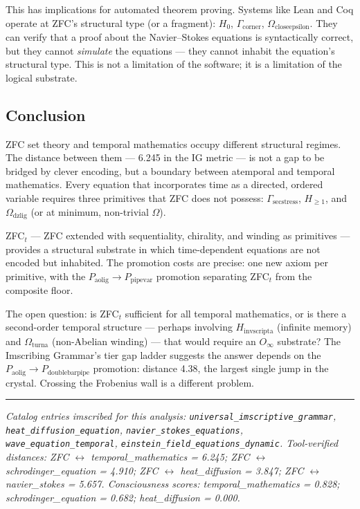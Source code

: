 \documentclass[12pt,a4paper]{article}
\begin{document}
This has implications for automated theorem proving. Systems like Lean and Coq operate at ZFC's structural type (or a fragment): $H_0$, $\Gamma_{\text{corner}}$, $\Omega_{\text{closeepsilon}}$. They can verify that a proof about the Navier--Stokes equations is syntactically correct, but they cannot \emph{simulate} the equations --- they cannot inhabit the equation's structural type. This is not a limitation of the software; it is a limitation of the logical substrate.

\subsection{Conclusion}

ZFC set theory and temporal mathematics occupy different structural regimes. The distance between them --- 6.245 in the IG metric --- is not a gap to be bridged by clever encoding, but a boundary between atemporal and temporal mathematics. Every equation that incorporates time as a directed, ordered variable requires three primitives that ZFC does not possess: $\Gamma_{\text{secstress}}$, $H_{\geq 1}$, and $\Omega_{\text{dzlig}}$ (or at minimum, non-trivial $\Omega$).

ZFC$_t$ --- ZFC extended with sequentiality, chirality, and winding as primitives --- provides a structural substrate in which time-dependent equations are not encoded but inhabited. The promotion costs are precise: one new axiom per primitive, with the $P_{\text{aolig}} \to P_{\text{pipevar}}$ promotion separating ZFC$_t$ from the composite floor.

The open question: is ZFC$_t$ sufficient for all temporal mathematics, or is there a second-order temporal structure --- perhaps involving $H_{\text{invscripta}}$ (infinite memory) and $\Omega_{\text{turna}}$ (non-Abelian winding) --- that would require an $O_{\infty}$ substrate? The Imscribing Grammar's tier gap ladder suggests the answer depends on the $P_{\text{aolig}} \to P_{\text{doublebarpipe}}$ promotion: distance 4.38, the largest single jump in the crystal. Crossing the Frobenius wall is a different problem.

\begin{center}
\rule{0.5\textwidth}{0.4pt}
\end{center}

\emph{Catalog entries imscribed for this analysis: \texttt{universal\_imscriptive\_grammar}, \texttt{heat\_diffusion\_equation}, \texttt{navier\_stokes\_equations}, \texttt{wave\_equation\_temporal}, \texttt{einstein\_field\_equations\_dynamic}. Tool-verified distances: ZFC $\leftrightarrow$ temporal\_mathematics = 6.245; ZFC $\leftrightarrow$ schrodinger\_equation = 4.910; ZFC $\leftrightarrow$ heat\_diffusion = 3.847; ZFC $\leftrightarrow$ navier\_stokes = 5.657. Consciousness scores: temporal\_mathematics = 0.828; schrodinger\_equation = 0.682; heat\_diffusion = 0.000.}
\end{document}
